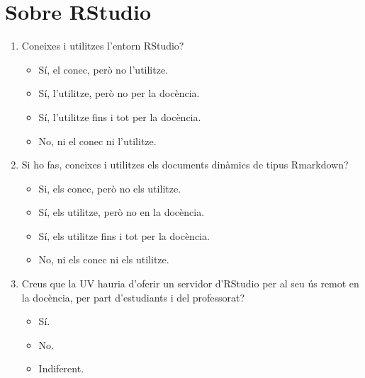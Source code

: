 \documentclass[a4paper,12pt]{article}
\newcounter{preg}[section]
\begin{document}
\section{Sobre RStudio}
\begin{enumerate}
\item {} Coneixes i utilitzes l'entorn RStudio? \cite{RStudio}
   \begin{itemize}
   \item Sí, el conec, però no l'utilitze.
   \item Sí, l'utilitze, però no per la docència.
   \item Sí, l'utilitze fins i tot per la docència.
   \item No, ni el conec ni l'utilitze.
   \end{itemize}

\item {} Si ho fas, coneixes i utilitzes els documents dinàmics de tipus Rmarkdown?
   \begin{itemize}
   \item Si, els conec, però no els utilitze.
   \item Sí, els utilitze, però no en la docència.
   \item Sí, els utilitze fins i tot per la docència.
   \item No, ni els conec ni els utilitze.
   \end{itemize}

\item Creus que la UV hauria d'oferir un servidor d'RStudio per al seu ús remot en la
      docència, per part d'estudiants i del professorat?
   \begin{itemize}
   \item Sí.
   \item No.
   \item Indiferent.
   \end{itemize}
\end{enumerate}
\end{document}

